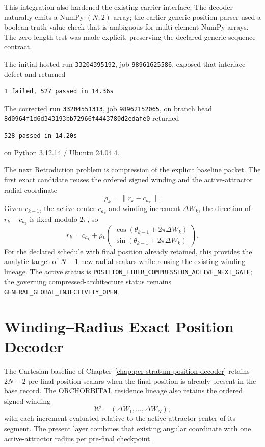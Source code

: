 This integration also hardened the existing carrier interface. The decoder naturally emits a NumPy $(N,2)$ array; the earlier generic position parser used a boolean truth-value check that is ambiguous for multi-element NumPy arrays. The zero-length test was made explicit, preserving the declared generic sequence contract.

The initial hosted run \texttt{33204395192}, job \texttt{98961625586}, exposed that interface defect and returned
\begin{verbatim}
1 failed, 527 passed in 14.36s
\end{verbatim}
The corrected run \texttt{33204551313}, job \texttt{98962152065}, on branch head \texttt{8d0964f1d6d343193bb72966f4443780d2edafe0} returned
\begin{verbatim}
528 passed in 14.20s
\end{verbatim}
on Python 3.12.14 / Ubuntu 24.04.4.

The next Retrodiction problem is compression of the explicit baseline packet. The first exact candidate reuses the ordered signed winding and the active-attractor radial coordinate
\[
\rho_k=\|r_k-c_{a_k}\|.
\]
Given $r_{k-1}$, the active center $c_{a_k}$ and winding increment $\Delta W_k$, the direction of $r_k-c_{a_k}$ is fixed modulo $2\pi$, so
\[
\boxed{
r_k=c_{a_k}+\rho_k
\begin{pmatrix}
\cos(\theta_{k-1}+2\pi\Delta W_k)\\
\sin(\theta_{k-1}+2\pi\Delta W_k)
\end{pmatrix}.
}
\]
For the declared schedule with final position already retained, this provides the analytic target of $N-1$ new radial scalars while reusing the existing winding lineage. The active status is \texttt{POSITION\_FIBER\_COMPRESSION\_ACTIVE\_NEXT\_GATE}; the governing compressed-architecture status remains \texttt{GENERAL\_GLOBAL\_INJECTIVITY\_OPEN}.


\chapter{Winding--Radius Exact Position Decoder}
\label{chap:winding-radius-position-decoder}

The Cartesian baseline of Chapter~\ref{chap:per-stratum-position-decoder} retains $2N-2$ pre-final position scalars when the final position is already present in the base record. The ORCHORBITAL residence lineage also retains the ordered signed winding
\[
\mathcal W=(\Delta W_1,\ldots,\Delta W_N),
\]
with each increment evaluated relative to the active attractor center of its segment. The present layer combines that existing angular coordinate with one active-attractor radius per pre-final checkpoint.

